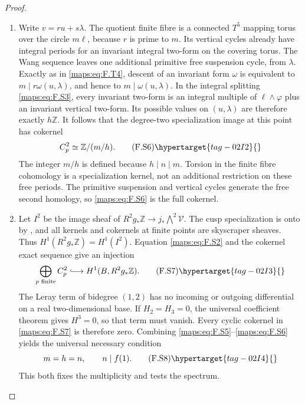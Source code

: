 \begin{proof}
\begin{enumerate}[label={$\langle1\rangle$\arabic*.}]
\item Write $v=ru+s\lambda$.  The quotient finite fibre is a
connected $T^5$ mapping torus over the circle $m\ell$,
because $r$ is prime to $m$.
Its vertical cycles already have integral periods for an
invariant integral two-form on the covering torus.
The Wang sequence leaves one additional primitive free
suspension cycle, from $\lambda$.
Exactly as in \eqref{maps:eq:F.T4}, descent of an invariant form $\omega$
is equivalent to
$m\mid r\omega(u,\lambda)$, and hence to
$m\mid\omega(u,\lambda)$.
In the integral splitting \eqref{maps:eq:F.S3}, every invariant two-form
is an integral multiple of $\ell\wedge\varphi$ plus an
invariant vertical two-form.  Its possible values on
$(u,\lambda)$ are therefore exactly $h\mathbb Z$.
It follows that the degree-two specialization image at
this point has cokernel
\[
 C^2_p\simeq\mathbb Z/(m/h).
 \tag{F.S6}\hypertarget{tag-02I2}{}\label{maps:eq:F.S6}
\]
The integer $m/h$ is defined because $h\mid n\mid m$.
Torsion in the finite fibre cohomology is a specialization
kernel, not an additional restriction on these free periods.
The primitive suspension and vertical cycles generate the
free second homology, so \eqref{maps:eq:F.S6} is the full cokernel.

\item Let $I^2$ be the image sheaf of
$R^2g_*\mathbb Z\to j_*\bigwedge^2\mathcal V$.
The cusp specialization is onto by , and all kernels
and cokernels at finite points are skyscraper sheaves.
Thus $H^1(R^2g_*\mathbb Z)=H^1(I^2)$.
Equation \eqref{maps:eq:F.S2} and the cokernel exact sequence give an
injection
\[
 \bigoplus_{p\text{ finite}}C^2_p
           \lhook\joinrel\longrightarrow H^1(B,R^2g_*\mathbb Z).
 \tag{F.S7}\hypertarget{tag-02I3}{}\label{maps:eq:F.S7}
\]
The Leray term of bidegree $(1,2)$ has no incoming or
outgoing differential on a real two-dimensional base.
If $H_2=H_3=0$, the universal coefficient theorem gives
$H^3=0$, so that term must vanish.
Every cyclic cokernel in \eqref{maps:eq:F.S7} is therefore zero.
Combining \eqref{maps:eq:F.S5}--\eqref{maps:eq:F.S6} yields the universal necessary
condition
\[
 m=h=n,\qquad n\mid f(1).
 \tag{F.S8}\hypertarget{tag-02I4}{}\label{maps:eq:F.S8}
\]
This both fixes the multiplicity and tests the spectrum.


\end{enumerate}
\end{proof}
